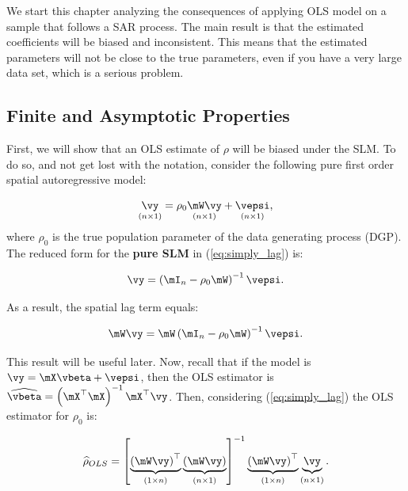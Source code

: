 \documentclass[english,12pt]{book}\usepackage[]{graphicx}\usepackage[]{xcolor}
\begin{document}
We start this chapter analyzing the consequences of applying OLS model on a sample that follows a SAR process. The main result is that the estimated coefficients will be biased and inconsistent. This means that the estimated parameters will not be close to the true parameters, even if you have a very large data set, which is a serious problem.

\subsection{Finite and Asymptotic Properties}

First, we will show that an OLS estimate of $\rho$ will be biased under the SLM. To do so, and not get lost with the notation, consider the following pure first order spatial autoregressive model:

\begin{equation}\label{eq:simply_lag}
\underset{(n\times 1)}{\vy} = \rho_0\underset{(n\times 1)}{\mW\vy} + \underset{(n\times 1)}{\vepsi},
\end{equation}
%
where $\rho_0$ is the true population parameter of the data generating process (DGP). The reduced form for the \textbf{pure SLM} in (\ref{eq:simply_lag}) is:

\begin{equation}\label{eq:reduced_form_pure_slm}
\vy =\left(\mI_n - \rho_0\mW\right)^{-1}\vepsi.
\end{equation}

As a result, the spatial lag term equals:

\begin{equation}\label{eq:wy_pure}
  \mW\vy = \mW\left(\mI_n - \rho_0\mW\right)^{-1}\vepsi.
\end{equation}

This result will be useful later. Now, recall that if the model is $\vy = \mX\vbeta + \vepsi$, then the OLS estimator is $\widehat{\vbeta} = \left(\mX^\top\mX\right)^{-1}\mX^\top\vy$. Then, considering (\ref{eq:simply_lag}) the OLS estimator for $\rho_0$ is: 

\begin{equation}\label{eq:rho_ols}
\widehat{\rho}_{OLS} = \left[\underbrace{\left(\mW\vy \right)^\top}_{(1\times n)}\underbrace{\left(\mW\vy \right)}_{(n\times 1)}\right]^{-1}\underbrace{\left(\mW\vy \right)^\top}_{(1\times n)}\underbrace{\vy}_{(n\times 1)}.
\end{equation}
\end{document}
